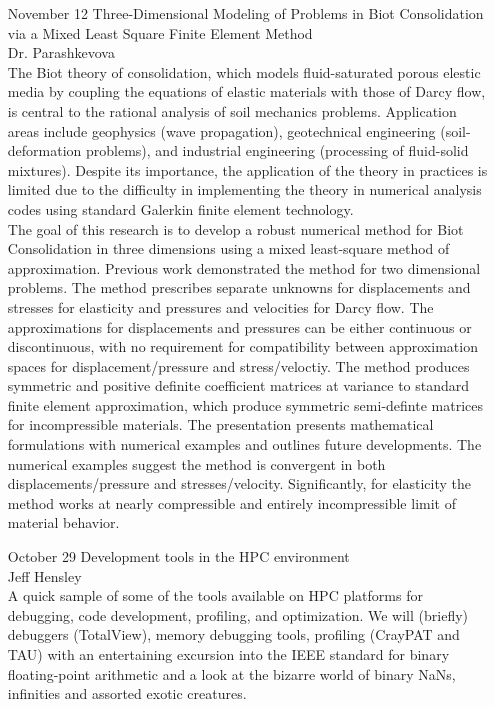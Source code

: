 \documentclass[12]{article}
\begin{document}
\begin{enumerate}
\item[November 12] Three-Dimensional Modeling of Problems in Biot Consolidation via a Mixed Least Square Finite Element Method\\ Dr. Parashkevova\\
  The Biot theory of consolidation, which models fluid-saturated porous elestic media by coupling the equations of elastic materials with those of Darcy flow, is central to the rational analysis of soil mechanics problems.  Application areas include geophysics (wave propagation), geotechnical engineering (soil-deformation problems), and industrial engineering (processing of fluid-solid mixtures).  Despite its importance, the application of the theory in practices is limited due to the difficulty in implementing the theory in numerical analysis codes using standard Galerkin finite element technology.\\
  The goal of this research is to develop a robust numerical method for Biot Consolidation in three dimensions using a mixed least-square method of approximation.  Previous work demonstrated the method for two dimensional problems.  The method prescribes separate unknowns for displacements and stresses for elasticity and pressures and velocities for Darcy flow.  The approximations for displacements and pressures can be either continuous or discontinuous, with no requirement for compatibility between approximation spaces for displacement/pressure and stress/veloctiy.  The method produces symmetric and positive definite coefficient matrices at variance to standard finite element approximation, which produce symmetric semi-definte matrices for incompressible materials.  The presentation presents mathematical formulations with numerical examples and outlines future developments.  The numerical examples suggest the method is convergent in both displacements/pressure and stresses/velocity.  Significantly, for elasticity the method works at nearly compressible and entirely incompressible limit of material behavior.

\item[October 29] Development tools in the HPC environment\\ Jeff Hensley\\
  A quick sample of some of the tools available on HPC platforms for debugging, code development, profiling, and optimization.  We will (briefly) debuggers (TotalView), memory debugging tools, profiling (CrayPAT and TAU) with an entertaining excursion into the IEEE standard for binary floating-point arithmetic and a look at the bizarre world of binary NaNs, infinities and assorted exotic creatures.


\end{enumerate}
\end{document}
